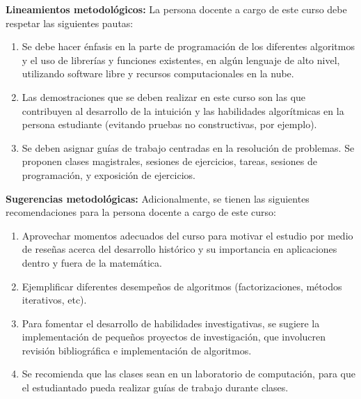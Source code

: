 \begin{refsection}
\noindent \textbf{Lineamientos metodológicos:} La persona docente a cargo de este curso debe respetar las siguientes pautas:
\begin{enumerate}
    \item Se debe hacer énfasis en la parte de programación de los diferentes algoritmos y el uso de librerías y funciones existentes, en algún lenguaje de alto nivel, utilizando software libre y recursos computacionales en la nube.
    \item Las demostraciones que se deben realizar en este curso son las que contribuyen al desarrollo de la intuición y las habilidades algorítmicas en la persona estudiante (evitando pruebas no constructivas, por ejemplo).
    \item Se deben asignar guías de trabajo centradas en la resolución de problemas. Se proponen clases magistrales, sesiones de ejercicios, tareas, sesiones de programación, y exposición de ejercicios.
\end{enumerate}

\textbf{Sugerencias metodológicas:} Adicionalmente, se tienen las siguientes recomendaciones para la persona docente a cargo de este curso:
\begin{enumerate}
    \item Aprovechar momentos adecuados del curso para motivar el estudio por medio de reseñas acerca del desarrollo histórico  y su importancia en aplicaciones dentro y fuera de la matemática.
    \item Ejemplificar diferentes desempeños de algoritmos (factorizaciones, métodos iterativos, etc).
    \item Para fomentar el desarrollo de habilidades investigativas, se sugiere la implementación de pequeños proyectos de investigación, que involucren revisión bibliográfica e implementación de algoritmos.
    \item Se recomienda que las clases sean en un laboratorio de computación, para que el estudiantado pueda realizar guías de trabajo durante clases.
\end{enumerate}

\nocite{Suli2003}
\nocite{Zhang}
\nocite{Overton}
\nocite{TrefethenIEEE}

\printcursosbibliography

\end{refsection}
